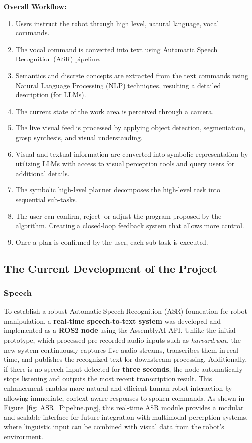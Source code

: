 \documentclass[12pt]{extarticle}
\begin{document}
\textbf{\underline{Overall Workflow:}}
\begin{enumerate}
    \item Users instruct the robot through high level, natural language, vocal commands.
    \item The vocal command is converted into text using Automatic Speech Recognition (ASR) pipeline.
    \item Semantics and discrete concepts are extracted from the text commands using Natural Language Processing (NLP) techniques, resulting a detailed description (for LLMs).
    \item The current state of the work area is perceived through a camera.
    \item The live visual feed is processed by applying object detection, segmentation, grasp synthesis, and visual understanding.
    \item Visual and textual information are converted into symbolic representation by utilizing LLMs with access to visual perception tools and query users for additional details.
    \item The symbolic high-level planner decomposes the high-level task into sequential sub-tasks.
    \item The user can confirm, reject, or adjust the program proposed by the algorithm. Creating a closed-loop feedback system that allows more control.
    \item Once a plan is confirmed by the user, each sub-task is executed.

\end{enumerate}

\subsection{The Current Development of the Project}

\subsubsection{Speech}
To establish a robust Automatic Speech Recognition (ASR) foundation for robot manipulation, a \textbf{real-time speech-to-text system} was developed and implemented as a \textbf{ROS2 node} using the AssemblyAI API. Unlike the initial prototype, which processed pre-recorded audio inputs such as \textit{harvard.wav}, the new system continuously captures live audio streams, transcribes them in real time, and publishes the recognized text for downstream processing. Additionally, if there is no speech input detected for \textbf{three seconds}, the node automatically stops listening and outputs the most recent transcription result. This enhancement enables more natural and efficient human-robot interaction by allowing immediate, context-aware responses to spoken commands. As shown in Figure~\ref{fig: ASR_Pipeline.png}, this real-time ASR module provides a modular and scalable interface for future integration with multimodal perception systems, where linguistic input can be combined with visual data from the robot’s environment.
\end{document}

